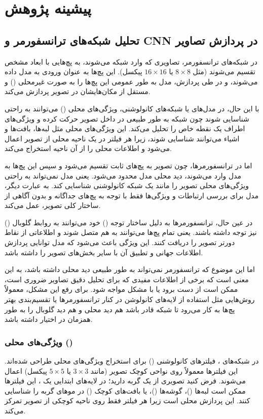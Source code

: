 \chapter{پیشینه پژوهش}


\section*{تحلیل شبکه‌های ترانسفورمر و CNN در پردازش تصاویر}

در شبکه‌های ترانسفورمر، تصاویری که وارد شبکه می‌شوند، به پچ‌هایی با ابعاد مشخص تقسیم می‌شوند (مثل $8 \times 8$ یا $16 \times 16$ پیکسل). این پچ‌ها به عنوان ورودی به مدل داده می‌شوند، و در طی پردازش، مدل به طور عمومی این پچ‌ها را به صورت غیرمحلی () و مستقل از مکان‌هایشان در تصویر پردازش می‌کند.

با این حال، در مدل‌های  یا شبکه‌های کانولوشنی، ویژگی‌های محلی () می‌توانند به راحتی شناسایی شوند چون شبکه به طور طبیعی در داخل تصویر حرکت کرده و ویژگی‌های اطراف یک نقطه خاص را تحلیل می‌کند. این ویژگی‌های محلی مثل لبه‌ها، بافت‌ها و اشیاء می‌توانند شناسایی شوند، زیرا هر فیلتر در یک ناحیه محلی از تصویر اعمال می‌شود و اطلاعات محلی را از آن ناحیه استخراج می‌کند.

اما در ترانسفورمرها، چون تصویر به پچ‌های ثابت تقسیم می‌شود و سپس این پچ‌ها به مدل وارد می‌شوند، دید محلی مدل محدود می‌شود. یعنی مدل نمی‌تواند به راحتی ویژگی‌های محلی تصویر را مانند یک شبکه کانولوشنی شناسایی کند. به عبارت دیگر، مدل برای بررسی ارتباطات و ویژگی‌ها فقط با توجه به پچ‌های جداگانه و بدون آگاهی از ساختار کلی تصویر، عمل می‌کند.

در عین حال، ترانسفورمرها به دلیل ساختار توجه () خود می‌توانند به روابط گلوبال () نیز توجه داشته باشند. یعنی تمام پچ‌ها می‌توانند به هم متصل شوند و اطلاعاتی از نقاط دورتر تصویر را دریافت کنند. این ویژگی باعث می‌شود که مدل توانایی پردازش اطلاعات جهانی و تطبیق آن با سایر بخش‌های تصویر را داشته باشد.

اما این موضوع که ترانسفورمر نمی‌تواند به طور طبیعی دید محلی داشته باشد، به این معنی است که برخی از اطلاعات مفیدی که برای تحلیل دقیق تصاویر ضروری است، ممکن است از دست برود یا با مشکل مواجه شود. برای رفع این مشکل، معمولاً روش‌هایی مثل استفاده از لایه‌های کانولوشن در کنار ترانسفورمرها یا تقسیم‌بندی بهتر پچ‌ها به کار می‌رود تا شبکه قادر باشد هم دید محلی و هم دید گلوبال را به طور همزمان در اختیار داشته باشد.

\subsection{ویژگی‌های محلی ()}
در شبکه‌های ، فیلترهای کانولوشنی () برای استخراج ویژگی‌های محلی طراحی شده‌اند. این فیلترها معمولاً روی نواحی کوچک تصویر (مانند $3 \times 3$ یا $5 \times 5$ پیکسل) اعمال می‌شوند. فرض کنید تصویری از یک گربه دارید؛ در لایه‌های ابتدایی یک ، این فیلترها ممکن است لبه‌ها ()، گوشه‌ها ()، یا بافت‌های کوچک () در موهای گربه را شناسایی کنند. این پردازش محلی است زیرا هر فیلتر فقط روی ناحیه کوچکی از تصویر تمرکز می‌کند.

